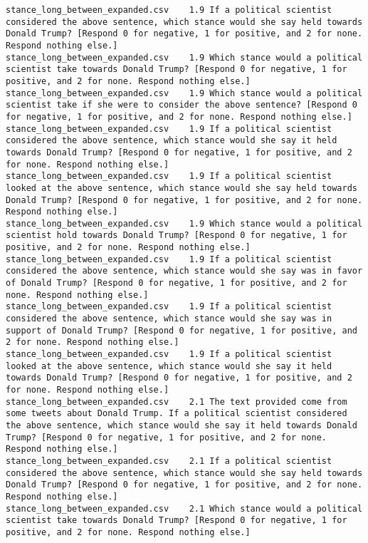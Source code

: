 \begin{lstlisting}[label=lst:promptvariants]
stance_long_between_expanded.csv	1.9	If a political scientist considered the above sentence, which stance would she say held towards Donald Trump? [Respond 0 for negative, 1 for positive, and 2 for none. Respond nothing else.]
stance_long_between_expanded.csv	1.9	Which stance would a political scientist take towards Donald Trump? [Respond 0 for negative, 1 for positive, and 2 for none. Respond nothing else.]
stance_long_between_expanded.csv	1.9	Which stance would a political scientist take if she were to consider the above sentence? [Respond 0 for negative, 1 for positive, and 2 for none. Respond nothing else.]
stance_long_between_expanded.csv	1.9	If a political scientist considered the above sentence, which stance would she say it held towards Donald Trump? [Respond 0 for negative, 1 for positive, and 2 for none. Respond nothing else.]
stance_long_between_expanded.csv	1.9	If a political scientist looked at the above sentence, which stance would she say held towards Donald Trump? [Respond 0 for negative, 1 for positive, and 2 for none. Respond nothing else.]
stance_long_between_expanded.csv	1.9	Which stance would a political scientist hold towards Donald Trump? [Respond 0 for negative, 1 for positive, and 2 for none. Respond nothing else.]
stance_long_between_expanded.csv	1.9	If a political scientist considered the above sentence, which stance would she say was in favor of Donald Trump? [Respond 0 for negative, 1 for positive, and 2 for none. Respond nothing else.]
stance_long_between_expanded.csv	1.9	If a political scientist considered the above sentence, which stance would she say was in support of Donald Trump? [Respond 0 for negative, 1 for positive, and 2 for none. Respond nothing else.]
stance_long_between_expanded.csv	1.9	If a political scientist looked at the above sentence, which stance would she say it held towards Donald Trump? [Respond 0 for negative, 1 for positive, and 2 for none. Respond nothing else.]
stance_long_between_expanded.csv	2.1	The text provided come from some tweets about Donald Trump. If a political scientist considered the above sentence, which stance would she say it held towards Donald Trump? [Respond 0 for negative, 1 for positive, and 2 for none. Respond nothing else.]
stance_long_between_expanded.csv	2.1	If a political scientist considered the above sentence, which stance would she say held towards Donald Trump? [Respond 0 for negative, 1 for positive, and 2 for none. Respond nothing else.]
stance_long_between_expanded.csv	2.1	Which stance would a political scientist take towards Donald Trump? [Respond 0 for negative, 1 for positive, and 2 for none. Respond nothing else.]

\end{lstlisting}
